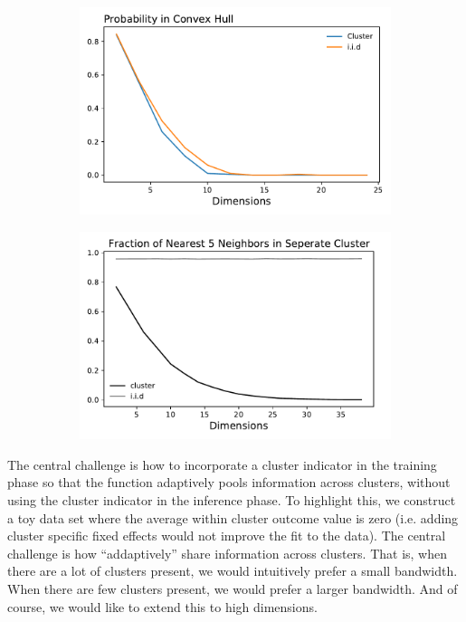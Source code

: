 \documentclass[a4paper,12pt]{article}
\begin{document}
\begin{figure}[htbp]
\centering
\begin{subfigure}{.48\textwidth}
    \centering
    \includegraphics[width=.95\linewidth]{figures/framework/iid_cluster.pdf}
    \caption{}
    \label{fig:higha}
\end{subfigure}
\begin{subfigure}{.48\textwidth}
    \centering
    \includegraphics[width=.95\linewidth]{figures/framework/nearest_neighbors_increasing_correlation.pdf}
    \caption{}
    \label{fig:highb}
\end{subfigure}
\caption{}
\label{fig:high}
\end{figure}



The central challenge is how to incorporate a cluster indicator in the training phase so that the function adaptively pools information across clusters, without using the cluster indicator in the inference phase. To highlight this, we construct a toy data set where the average within cluster outcome value is zero (i.e. adding cluster specific fixed effects would not improve the fit to the data). The central challenge is how ``addaptively'' share information across clusters. That is, when there are a lot of clusters present, we would intuitively prefer a small bandwidth. When there are few clusters present, we would prefer a larger bandwidth. And of course, we would like to extend this to high dimensions.
\end{document}
